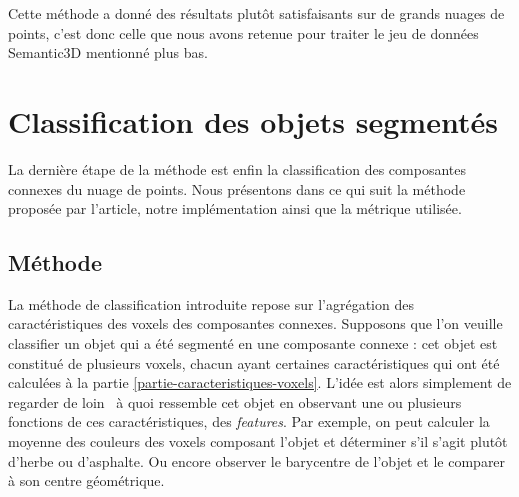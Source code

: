 \documentclass[a4paper, onecolumn, 11pt]{article}
\begin{document}
Cette méthode a donné des résultats plutôt satisfaisants sur de grands nuages de points, c'est donc celle que nous avons retenue pour traiter le jeu de données Semantic3D mentionné plus bas.

\section{Classification des objets segmentés}
La dernière étape de la méthode est enfin la classification des composantes connexes du nuage de points. Nous présentons dans ce qui suit la méthode proposée par l'article, notre implémentation ainsi que la métrique utilisée.

\subsection{Méthode}
La méthode de classification introduite repose sur l'agrégation des caractéristiques des voxels des composantes connexes. Supposons que l'on veuille classifier un objet qui a été segmenté en une composante connexe : cet objet est constitué de plusieurs voxels, chacun ayant certaines caractéristiques qui ont été calculées à la partie \ref{partie-caracteristiques-voxels}. L'idée est alors simplement de regarder \og de loin \fg\ à quoi ressemble cet objet en observant une ou plusieurs fonctions de ces caractéristiques, des \emph{features}. Par exemple, on peut calculer la moyenne des couleurs des voxels composant l'objet et déterminer s'il s'agit plutôt d'herbe ou d'asphalte. Ou encore observer le barycentre de l'objet et le comparer à son centre géométrique.
\end{document}
